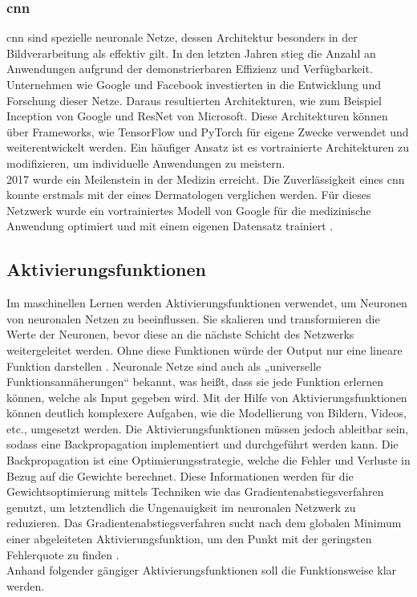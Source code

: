 \documentclass[12pt,a4paper]{article}
\begin{document}
		\subsubsection*{\ac{cnn}} %
			\ac{cnn} sind spezielle neuronale Netze, dessen Architektur besonders in der Bildverarbeitung als effektiv gilt.
			In den letzten Jahren stieg die Anzahl an Anwendungen aufgrund der demonstrierbaren Effizienz und Verfügbarkeit. 
			Unternehmen wie Google und Facebook investierten in die Entwicklung und Forschung dieser Netze.
			Daraus resultierten Architekturen, wie zum Beispiel Inception von Google und ResNet von Microsoft.
			Diese Architekturen können über Frameworks, wie TensorFlow und PyTorch für eigene Zwecke verwendet und weiterentwickelt werden.
			Ein häufiger Ansatz ist es vortrainierte Architekturen zu modifizieren, um individuelle Anwendungen zu meistern.\\
			2017 wurde ein Meilenstein in der Medizin erreicht.
			Die Zuverlässigkeit eines \ac{cnn} konnte erstmals mit der eines Dermatologen verglichen werden.
			Für dieses Netzwerk wurde ein vortrainiertes Modell von Google für die medizinische Anwendung optimiert und mit einem eigenen Datensatz trainiert \cite[\ac{vgl}][]{10.1111/bjd.18880}.

	\subsection{Aktivierungsfunktionen}
		Im maschinellen Lernen werden Aktivierungsfunktionen verwendet, um Neuronen von neuronalen Netzen zu beeinflussen. 
		Sie skalieren und transformieren die Werte der Neuronen, bevor diese an die nächste Schicht des Netzwerks weitergeleitet werden. 
		Ohne diese Funktionen würde der Output nur eine lineare Funktion darstellen \cite[\ac{vgl}][]{site:activationfunctions}. 
		Neuronale Netze sind auch als „universelle Funktionsannäherungen“ bekannt, was heißt, dass sie jede Funktion erlernen können, welche als Input gegeben wird. 
		Mit der Hilfe von Aktivierungsfunktionen können deutlich komplexere Aufgaben, wie die Modellierung von Bildern, Videos, etc., umgesetzt werden. 
		Die Aktivierungsfunktionen müssen jedoch ableitbar sein, sodass eine Backpropagation implementiert und durchgeführt werden kann. 
		Die Backpropagation ist eine Optimierungsstrategie, welche die Fehler und Verluste in Bezug auf die Gewichte berechnet. 
		Diese Informationen werden für die Gewichtsoptimierung mittels Techniken wie das Gradientenabstiegsverfahren genutzt, um letztendlich die Ungenauigkeit im neuronalen Netzwerk zu reduzieren. 
		Das Gradientenabstiegsverfahren sucht nach dem globalen Minimum einer abgeleiteten Aktivierungsfunktion, um den Punkt mit der geringsten Fehlerquote zu finden \cite[\ac{vgl}][]{site:machinelearningautomation}.\\
		Anhand folgender gängiger Aktivierungsfunktionen soll die Funktionsweise klar werden. 
\end{document}
